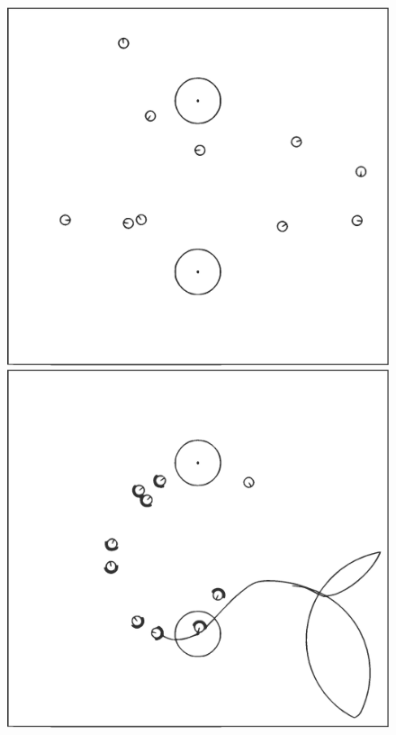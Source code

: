 \begin{figure}[h]
    \centering
    \begin{minipage}{.3\textwidth}
        \includegraphics[width=\textwidth]{figures/simulation-28-t0-bold}
    \end{minipage}%
    \begin{minipage}{.3\textwidth}
        \includegraphics[width=\textwidth]{figures/simulation-28-t60-bold}

\end{minipage}
\end{figure}
